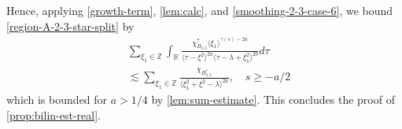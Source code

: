 \documentclass[12pt,reqno]{amsart}
\numberwithin{equation}{section}  %
\numberwithin{figure}{section}
\newcommand{\rr}{\mathbb{R}}
\newcommand{\zz}{\mathbb{Z}}
\theoremstyle{plain}
\theoremstyle{definition}
\theoremstyle{remark}
\begin{document}
Hence, applying
\eqref{growth-term}, \autoref{lem:calc}, and
\eqref{smoothing-2-3-case-6}, we bound \eqref{region-A-2-3-star-split} by
%
%
\begin{equation*}
\begin{split}
   & \sum_{\xi_{1} \in \zz} \int_{\rr} \frac{\chi^{*}_{B_{3,3}} \langle
   \xi_{1} \rangle ^{\gamma(s) -2a}
    }{ \langle  \tau  - \xi^{2}
    \rangle ^{2a}   \langle  \tau - \lambda+\xi_{1}^{2}
\rangle^{2b} } d \tau
\\
& \lesssim  \sum_{\xi_{1} \in \zz} \frac{\chi_{B_{3,3}^{*}}}{\langle \xi_{1}^{2} +
\xi^{2} - \lambda \rangle^{2 a} }, \quad s \ge -a/2
\end{split}
\end{equation*}
which is bounded for $a > 1/4$ by
\autoref{lem:sum-estimate}. This concludes the proof of \autoref{prop:bilin-est-real}. \qquad \qedsymbol
%
%
\end{document}
